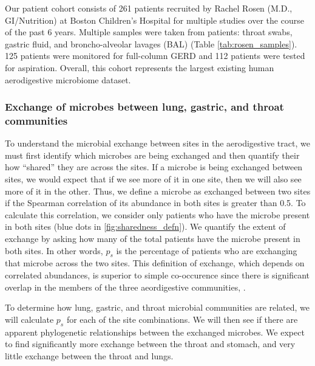 \documentclass[12pt]{article}
\begin{document}
Our patient cohort consists of 261 patients recruited by Rachel Rosen 
(M.D., GI/Nutrition) at Boston Children's Hospital for multiple 
studies over the course of the past 6 years. Multiple samples were 
taken from patients: throat swabs, gastric fluid, and broncho-alveolar 
lavages (BAL) (Table \ref{tab:rosen_samples}). 125 patients were 
monitored for full-column GERD and 112 patients were tested for 
aspiration. Overall, this cohort represents the largest existing human 
aerodigestive microbiome dataset.

\subsubsection{Exchange of microbes between lung, gastric, and throat communities} \label{sec:exchange}

To understand the microbial exchange between sites in the 
aerodigestive tract, we must first identify which microbes are being exchanged
and then quantify their how ``shared'' they are across the sites. 
If a microbe is being exchanged between sites, we would expect that if we see 
more of it in one site, then we will also see more of it in the other. 
Thus, we define a microbe as exchanged between two sites if the Spearman 
correlation of its abundance in both sites is greater than 0.5. To 
calculate this correlation, we consider only patients who have the microbe present in both sites (blue dots in \ref{fig:sharedness_defn}).
We quantify the extent of exchange by asking how many of the total patients
have the microbe present in both sites. In other words, $p_s$ is the 
percentage of patients who are exchanging that microbe across the two sites.
This definition of exchange, which depends on correlated abundances, is 
superior to simple co-occurence since there is significant overlap in the
members of the three aeordigestive communities\cite{bassis-source-2015}, \cite{charslon-topographical-2011}.

To determine how lung, gastric, and throat microbial communities are related,
we will calculate $p_s$ for each of the site combinations. We will 
then see if there are apparent phylogenetic relationships between
the exchanged microbes. We expect to find significantly more exchange
between the throat and stomach, and very little exchange between the throat and lungs. 
\end{document}
